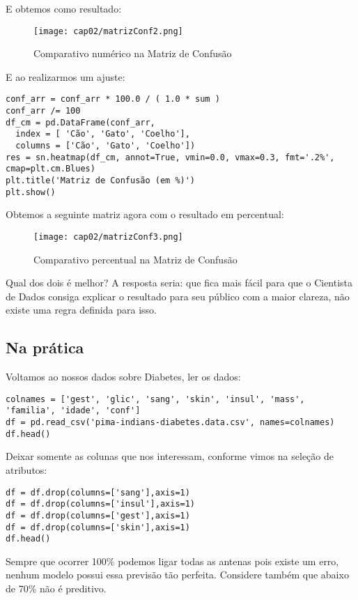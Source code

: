 E obtemos como resultado:
\begin{figure}[H]
	\centering
	\texttt{[image: cap02/matrizConf2.png]}
	\caption{Comparativo numérico na Matriz de Confusão}
\end{figure}

E ao realizarmos um ajuste:
\begin{lstlisting}
conf_arr = conf_arr * 100.0 / ( 1.0 * sum )
conf_arr /= 100
df_cm = pd.DataFrame(conf_arr,
  index = [ 'Cão', 'Gato', 'Coelho'],
  columns = ['Cão', 'Gato', 'Coelho'])
res = sn.heatmap(df_cm, annot=True, vmin=0.0, vmax=0.3, fmt='.2%', cmap=plt.cm.Blues)
plt.title('Matriz de Confusão (em %)')
plt.show()
\end{lstlisting}

Obtemos a seguinte matriz agora com o resultado em percentual:
\begin{figure}[H]
	\centering
	\texttt{[image: cap02/matrizConf3.png]}
	\caption{Comparativo percentual na Matriz de Confusão}
\end{figure}

Qual dos dois é melhor? A resposta seria: que fica mais fácil para que o Cientista de Dados consiga explicar o resultado para seu público com a maior clareza, não existe uma regra definida para isso. 

\subsection{Na prática}
Voltamos ao nossos dados sobre Diabetes, ler os dados:
\begin{lstlisting}
colnames = ['gest', 'glic', 'sang', 'skin', 'insul', 'mass', 'familia', 'idade', 'conf']
df = pd.read_csv('pima-indians-diabetes.data.csv', names=colnames)
df.head()
\end{lstlisting}

Deixar somente as colunas que nos interessam, conforme vimos na seleção de atributos:
\begin{lstlisting}
df = df.drop(columns=['sang'],axis=1)
df = df.drop(columns=['insul'],axis=1)
df = df.drop(columns=['gest'],axis=1)
df = df.drop(columns=['skin'],axis=1)
df.head()
\end{lstlisting}

\begin{note}[100\% de Precisão] 
	Sempre que ocorrer 100\% podemos ligar todas as antenas pois existe um erro, nenhum modelo possui essa previsão tão perfeita. Considere também que abaixo de 70\% não é preditivo.
\end{note}

